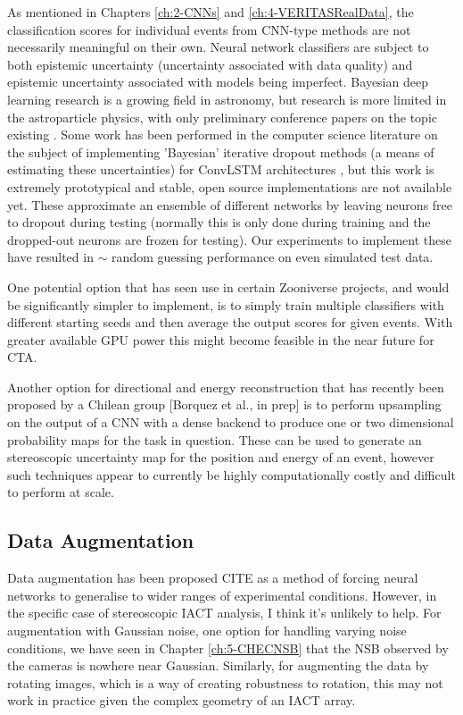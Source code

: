As mentioned in Chapters \ref{ch:2-CNNs} and \ref{ch:4-VERITASRealData}, the classification scores for individual events from CNN-type methods are not necessarily meaningful on their own. Neural network classifiers are subject to both epistemic uncertainty (uncertainty associated with data quality) and epistemic uncertainty associated with models being imperfect. Bayesian deep learning research is a growing field in astronomy, but research is more limited in the astroparticle physics, with only preliminary conference papers on the topic existing \cite{bayesianwcd}. Some work has been performed in the computer science literature on the subject of implementing 'Bayesian' iterative dropout methods (a means of estimating these uncertainties) for ConvLSTM architectures \cite{bayesconv},  but this work is extremely prototypical and stable, open source implementations are not available yet. These approximate an ensemble of different networks by leaving neurons free to dropout during testing (normally this is only done during training and the dropped-out neurons are frozen for testing). Our experiments to implement these have resulted in $\sim$ random guessing performance on even simulated test data.

One potential option that has seen use in certain Zooniverse projects, and would be significantly simpler to implement, is to simply train multiple classifiers with different starting seeds and then average the output scores for given events. With greater available GPU power this might become feasible in the near future for CTA.

Another option for directional and energy reconstruction that has recently been proposed by a Chilean group [Borquez et al., in prep] is to perform upsampling on the output of a CNN with a dense backend to produce one or two dimensional probability maps for the task in question. These can be used to generate an stereoscopic uncertainty map for the position and energy of an event, however such techniques appear to currently be highly computationally costly and difficult to perform at scale.

\subsection{Data Augmentation}
Data augmentation has been proposed CITE as a method of forcing neural networks to generalise to wider ranges of experimental conditions. However, in the specific case of stereoscopic IACT analysis, I think it's unlikely to help. For augmentation with Gaussian noise, one option for handling varying noise conditions, we have seen in Chapter \ref{ch:5-CHECNSB} that the NSB observed by the cameras is nowhere near Gaussian. Similarly, for augmenting the data by rotating images, which is a way of creating robustness to rotation, this may not work in practice given the complex geometry of an IACT array.
